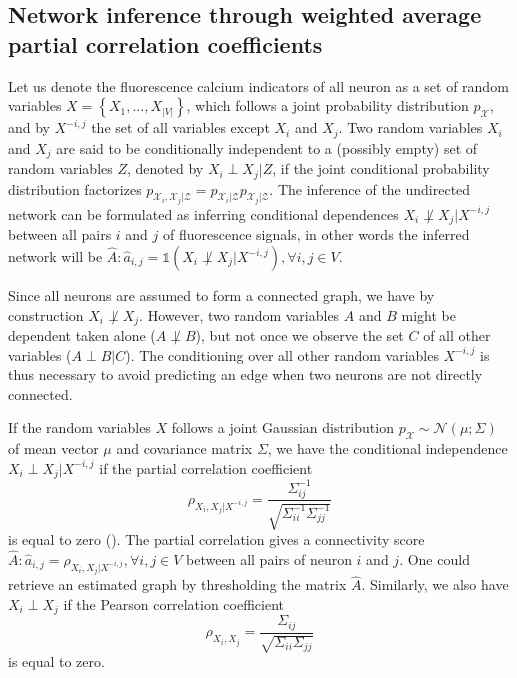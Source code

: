 \documentclass[wcp]{jmlr}
\begin{document}

\subsection{Network inference through weighted average partial correlation
            coefficients}
\label{sec:inference}

Let us denote the fluorescence calcium indicators of all neuron
as a set of random variables $X = \left\{X_1, \ldots, X_{|V|}\right\}$, which follows
a joint probability distribution $p_\mathcal{X}$, and by
$X^{-i,j}$ the set of all variables except $X_i$ and $X_j$.
Two random variables $X_i$ and $X_j$ are said to be conditionally independent
to a (possibly empty) set of random variables $Z$, denoted by $X_i \perp X_j | Z$,
if the joint conditional probability distribution factorizes
$p_{\mathcal{X}_i, \mathcal{X}_j|\mathcal{Z}} = p_{\mathcal{X}_i|\mathcal{Z}}
p_{\mathcal{X}_j|\mathcal{Z}}$.  The inference of the undirected network
can be formulated as inferring conditional dependences
$X_i \not\perp X_j | X^{-i,j}$ between all pairs $i$ and $j$ of fluorescence
signals, in other words the inferred network will be
$\hat{A}: \hat{a}_{i,j} = \mathbb{1}(X_i \not\perp X_j | X^{-i,j}), \forall i, j \in V$.


Since all neurons are assumed to form a connected graph, we
have by construction $X_i \not\perp X_j$. However, two random variables $A$ and $B$ might be
dependent taken alone ($A \not\perp B$), but not once we observe the set  $C$
of all other variables ($A \perp B | C$). The conditioning over all other
random variables $X^{-i,j}$ is thus necessary to avoid predicting an edge when
two neurons are not directly connected.

If the random variables $X$ follows a joint Gaussian distribution
$p_\mathcal{X} \sim \mathcal{N}(\mu; \Sigma)$ of mean vector $\mu$ and
covariance matrix $\Sigma$, we have the conditional independence
$X_i \perp X_j | X^{-i,j}$ if the partial correlation coefficient
\[
\rho_{X_i, X_j | X^{-i,j}}
= \frac{\Sigma^{-1}_{ij}}{\sqrt{\Sigma^{-1}_{ii} \Sigma^{-1}_{jj}}}
\]
is equal to zero (\cite{koller2009probabilistic}). The partial correlation gives
a connectivity score
$\hat{A}: \hat{a}_{i,j} = \rho_{X_i, X_j | X^{-i,j}}, \forall i, j \in V$ between all
pairs of neuron $i$ and $j$. One could retrieve an estimated graph by thresholding
the matrix $\hat{A}$.
Similarly, we also have $X_i \perp X_j$ if the Pearson correlation
coefficient
\[
\rho_{X_i,X_j} = \frac{\Sigma_{ij}}{\sqrt{\Sigma_{ii}
\Sigma_{jj}}}
\]
is equal to zero.
\end{document}
